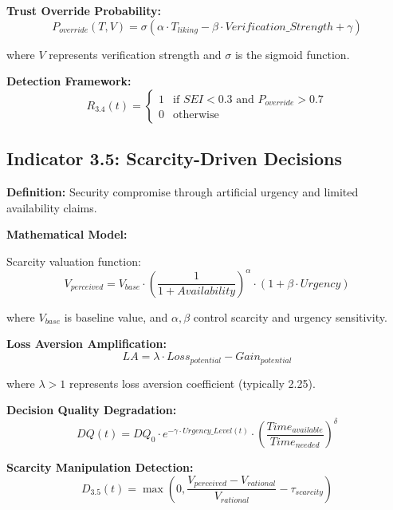 \documentclass[11pt,a4paper]{article}
\begin{document}
\textbf{Trust Override Probability:}
\begin{equation}
P_{override}(T,V) = \sigma\left(\alpha \cdot T_{liking} - \beta \cdot Verification\_Strength + \gamma\right)
\end{equation}

where $V$ represents verification strength and $\sigma$ is the sigmoid function.

\textbf{Detection Framework:}
\begin{equation}
R_{3.4}(t) = \begin{cases}
1 & \text{if } SEI < 0.3 \text{ and } P_{override} > 0.7 \\
0 & \text{otherwise}
\end{cases}
\end{equation}

\subsection{Indicator 3.5: Scarcity-Driven Decisions}

\textbf{Definition:} Security compromise through artificial urgency and limited availability claims.

\textbf{Mathematical Model:}

Scarcity valuation function:
\begin{equation}
V_{perceived} = V_{base} \cdot \left(\frac{1}{1 + Availability}\right)^{\alpha} \cdot (1 + \beta \cdot Urgency)
\end{equation}

where $V_{base}$ is baseline value, and $\alpha, \beta$ control scarcity and urgency sensitivity.

\textbf{Loss Aversion Amplification:}
\begin{equation}
LA = \lambda \cdot Loss_{potential} - Gain_{potential}
\end{equation}

where $\lambda > 1$ represents loss aversion coefficient (typically 2.25).

\textbf{Decision Quality Degradation:}
\begin{equation}
DQ(t) = DQ_0 \cdot e^{-\gamma \cdot Urgency\_Level(t)} \cdot \left(\frac{Time_{available}}{Time_{needed}}\right)^{\delta}
\end{equation}

\textbf{Scarcity Manipulation Detection:}
\begin{equation}
D_{3.5}(t) = \max\left(0, \frac{V_{perceived} - V_{rational}}{V_{rational}} - \tau_{scarcity}\right)
\end{equation}
\end{document}
